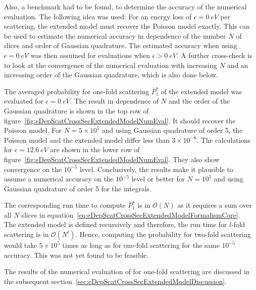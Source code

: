 Also, a benchmark had to be found, to determine the accuracy of the numerical evaluation. The following idea was used: For an energy loss of $\epsilon=\SI{0}{eV}$ per scattering, the extended model must recover the Poisson model exactly. This can be used to estimate the numerical accuracy in dependence of the number $N$ of slices and order of Gaussian quadrature. The estimated accuracy when using $\epsilon=\SI{0}{eV}$ was then assumed for evaluations when $\epsilon>\SI{0}{eV}$. A further cross-check is to look at the convergence of the numerical evaluation with increasing $N$ and an increasing order of the Gaussian quadrature, which is also done below.

The averaged probability for one-fold scattering $\bar{P}^{\star}_1$ of the extended model was evaluated for $\epsilon=\SI{0}{eV}$. The result in dependence of $N$ and the order of the Gaussian quadrature is shown in the top row of figure~\ref{fig:eDepScatCrossSecExtendedModelNumEval}. It should recover the Poisson model. For $N=5\times10^5$ and using Gaussian quadrature of order 5, the Poisson model and the extended model differ less than $3\times10^{-6}$. The calculations for $\epsilon=\SI{12.6}{eV}$ are shown in the lower row of figure~\ref{fig:eDepScatCrossSecExtendedModelNumEval}. They also show convergence on the $10^{-5}$ level. Conclusively, the results make it plausible to assume a numerical accuracy on the $10^{-5}$ level or better for $N=10^5$ and using Gaussian quadrature of order 5 for the integrals.

The corresponding run time to compute $\bar{P}^{\star}_1$ is in $\mathcal{O}(N)$ as it requires a sum over all $N$ slices in equation~\eqref{eq:eDepScatCrossSecExtendedModelFormalismCore}. The extended model is defined recursively and therefore, the run time for $l$-fold scattering is in $\mathcal{O}(N^l)$. Hence, computing the probability for two-fold scattering would take $5\times10^5$ times as long as for one-fold scattering for the same $10^{-5}$ accuracy. This was not yet found to be feasible.

The results of the numerical evaluation of for one-fold scattering are discussed in the subsequent section~\ref{sec:eDepScatCrossSecExtendedModelDiscussion}.
\FloatBarrier

